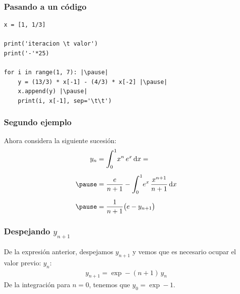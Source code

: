 \documentclass[12pt]{beamer}
\begin{document}
\begin{frame}[fragile]
\frametitle{Pasando a un código}
\begin{lstlisting}[caption=Implementando el código de la sucesión]
x = [1, 1/3]

print('iteracion \t valor')
print('-'*25)

for i in range(1, 7): |\pause|
	y = (13/3) * x[-1] - (4/3) * x[-2] |\pause|
	x.append(y) |\pause|
	print(i, x[-1], sep='\t\t') 
\end{lstlisting}
\end{frame}
\begin{frame}
\frametitle{Segundo ejemplo}
Ahora considera la siguiente sucesión:
\pause
\begin{eqnarray*}
\begin{aligned}
y_{n} &= \scaleint{6ex}_{\bs 0}^{1} x^{n} \, e^{x} \dd{x} = \\[0.5em] \pause
&= \dfrac{e}{n+1} - \scaleint{6ex}_{\bs 0}^{1} e^{x} \, \dfrac{x^{n+1}}{n + 1} \dd{x} \\[0.5em] \pause
&= \dfrac{1}{n+1} \big( e - y_{n+1} \big)
\end{aligned}
\end{eqnarray*}
\end{frame}
\begin{frame}
\frametitle{Despejando $y_{n+1}$}
De la expresión anterior, despejamos $y_{n+1}$ y vemos que es necesario ocupar el valor previo: $y_{n}$:
\pause
\begin{align*}
y_{n+1} = \exp - (n + 1) \, y_{n}
\end{align*}
De la integración para $n = 0$, tenemos que $y_{0} = \exp - 1$.
\end{frame}
\end{document}
